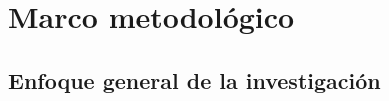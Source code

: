 %     

\chapter{Marco metodológico}%
\label{cap:capitulo3}%



\section{Enfoque general de la investigación}
\label{sec:enfoque}



